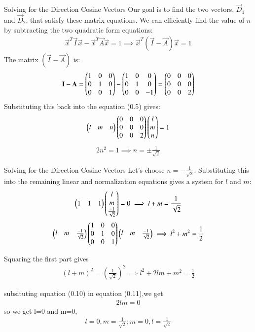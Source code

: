 \documentclass{beamer}
\begin{document}
\begin{frame}{Solving for the Direction Cosine Vectors}
    Our goal is to find the two vectors, $\vec{D}_1$ and $\vec{D}_2$, that satisfy these matrix equations.
 We can efficiently find the value of $n$ by subtracting the two quadratic form equations:
\begin{align}
\vec{x}^T \vec{I} \vec{x} - \vec{x}^T \vec{A} \vec{x} = 1 \implies \vec{x}^T (\vec{I} - \vec{A}) \vec{x} = 1
\end{align}
The matrix $(\vec{I} - \vec{A})$ is:
\begin{align}
\mathbf{I} - \mathbf{A} = \begin{pmatrix} 1 & 0 & 0 \\ 0 & 1 & 0 \\ 0 & 0 & 1 \end{pmatrix} -\begin{pmatrix} 1 & 0 & 0 \\ 0 & 1 & 0 \\ 0 & 0 & -1 \end{pmatrix} = \begin{pmatrix} 0 & 0 & 0 \\ 0 & 0 & 0 \\ 0 & 0 & 2 \end{pmatrix}
\end{align}
Substituting this back into the equation (0.5) gives:
\begin{align}
\begin{pmatrix} l & m & n \end{pmatrix} \begin{pmatrix} 0 & 0 & 0 \\ 0 & 0 & 0 \\ 0 & 0 & 2\end{pmatrix} \begin{pmatrix} l \\ m \\ n\end{pmatrix} = 1
\end{align}
\begin{align}
2n^2 = 1 \implies n = \pm \frac{1}{\sqrt{2}}
\end{align}
    
\end{frame}
\begin{frame}{Solving for the Direction Cosine Vectors}
    Let's choose $n = -\frac{1}{\sqrt{2}}$. Substituting this into the remaining linear and normalization equations gives a system for $l$ and $m$:
\begin{align}
     \begin{pmatrix}1&1&1\end{pmatrix}\begin{pmatrix}l\\ m \\ \frac{-1}{\sqrt{2}}\end{pmatrix}=0 \implies l+m=\frac{1}{\sqrt{2}}
     \end{align}
     \begin{align}
     \begin{pmatrix}l &m &\frac{-1}{\sqrt{2}}\end{pmatrix}\begin{pmatrix} 1 & 0 & 0 \\ 0 & 1 & 0 \\ 0 & 0 & 1 \end{pmatrix}\begin{pmatrix}l &m &\frac{-1}{\sqrt{2}}\end{pmatrix} \implies l^2 + m^2 = \frac{1}{2}
     \end{align}
     
Squaring the first part gives
\begin{align}
(l+m)^2 = \left(\frac{1}{\sqrt{2}}\right)^2 \implies l^2+2lm+m^2 = \frac{1}{2}
\end{align}

subsituting equation (0.10) in equation (0.11),we get
\begin{align}
    2lm=0
\end{align}
so we get l=0 and m=0,
\begin{align}
      l=0, m = \frac{1}{\sqrt{2}};
      m=0,l = \frac{1}{\sqrt{2}}
\end{align}
\end{frame}
\end{document}
